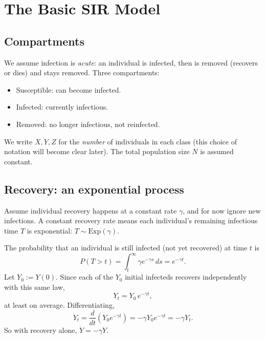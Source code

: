 \chapter{The Basic SIR Model}

\section{Compartments}

We assume infection is \emph{acute}: an individual is infected, then
is removed (recovers or dies) and stays removed. Three compartments:
\begin{itemize}[nosep]
  \item Susceptible: can become infected.
  \item Infected: currently infectious.
  \item Removed: no longer infectious, not reinfected.
\end{itemize}


We write $X,Y,Z$ for the \emph{number} of individuals in each class
(this choice of notation will become clear later). The total
population size $N$ is assumed constant.

\section{Recovery: an exponential process}

Assume individual recovery happens at a constant rate $\gamma$, and
for now ignore new infections. A constant recovery rate means each
individual's remaining infectious time $T$ is exponential:
$T\sim\text{Exp}(\gamma)$.

The probability that an individual is still infected (not yet
recovered) at time $t$ is
\[
P(T>t) = \int_t^\infty \gamma e^{-\gamma s}\,ds = e^{-\gamma t}.
\]
Let $Y_0:=Y(0)$. Since each of the $Y_0$ initial infecteds recovers
independently with this same law,
\[
Y_t = Y_0\,e^{-\gamma t},
\]
at least on average. Differentiating,
\[
\dot Y_t = \frac{d}{dt}\left(Y_0 e^{-\gamma t}\right) = -\gamma Y_0 e^{-\gamma t} = -\gamma Y_t.
\]
So with recovery alone, $\dot Y = -\gamma Y$.

